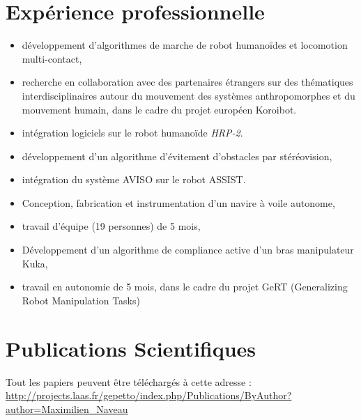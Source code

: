 \documentclass[11pt,a4paper]{moderncv}
\newcommand{\items}{\item \hspace{2mm}}
\begin{document}
\section{Exp\'erience professionnelle}
{
\begin{itemize}%
\items d\'eveloppement d'algorithmes de marche de robot humano\"ides et locomotion multi-contact,
\items recherche en collaboration avec des partenaires \'etrangers sur des th\'ematiques interdisciplinaires autour du mouvement des syst\`emes anthropomorphes et du mouvement humain, dans le cadre du projet europ\'een Koroibot.
\items int\'egration logiciels sur le robot humano\"ide \emph{HRP-2}.
\newline{}
\end{itemize}
}
%
%
{
\begin{itemize}%
\items d\'eveloppement d'un algorithme d'\'evitement d'obstacles par st\'er\'eovision,
\items int\'egration du syst\`eme AVISO sur le robot ASSIST.
\newline{}
\end{itemize}
}
%
%
{
\begin{itemize}%
\items Conception, fabrication et instrumentation d'un navire \`a voile autonome,
\items travail d'\'equipe (19 personnes) de 5 mois,
\newline{}
\end{itemize}
}
%
%
%
{
\begin{itemize}%
\items D\'eveloppement d'un algorithme de compliance active d'un bras manipulateur Kuka,
\items travail en autonomie de 5 mois, dans le cadre du projet GeRT (Generalizing Robot Manipulation Tasks)
\newline{}
\end{itemize}
}



\section{Publications Scientifiques}

Tout les papiers peuvent \^etre t\'el\'echarg\'es \`a cette adresse :
\url{http://projects.laas.fr/gepetto/index.php/Publications/ByAuthor?author=Maximilien_Naveau}\\
\end{document}
